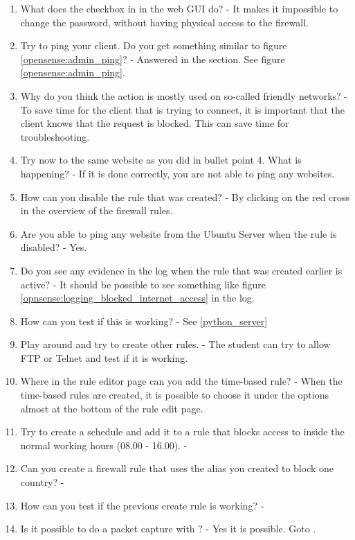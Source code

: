 \begin{enumerate}
    \item What does the  checkbox in  in the web GUI do? - It makes it impossible to change the password, without having physical access to the firewall.
    \item Try to ping your client. Do you get something similar to figure \ref{opensense:admin_ping}? - Answered in the section. See figure \ref{opensense:admin_ping}.
    \item Why do you think the action  is mostly used on so-called friendly networks? - To save time for the client that is trying to connect, it is important that the client knows that the request is blocked. This can save time for troubleshooting.
    \item Try now to  the same website as you did in bullet point 4. What is happening? - If it is done correctly, you are not able to ping any websites.
    \item How can you disable the rule that was created? - By clicking on the red cross in the overview of the firewall rules.
    \item Are you able to ping any website from the Ubuntu Server when the rule is disabled? - Yes.
    \item Do you see any evidence in the log when the rule that was created earlier is active? - It should be possible to see something like figure \ref{opnsense:logging_blocked_internet_access} in the log.
    \item How can you test if this is working? - See \ref{python_server}
    \item Play around and try to create other rules. - The student can try to allow FTP or Telnet and test if it is working.
    \item Where in the rule editor page can you add the time-based rule? - When the time-based rules are created, it is possible to choose it under the  options almost at the bottom of the rule edit page.
    \item Try to create a schedule and add it to a rule that blocks access to  inside the normal working hours (08.00 - 16.00). - 
    \item Can you create a firewall rule that uses the alias you created to block one country? -
    \item How can you test if the previous create rule is working? -
    \item Is it possible to do a packet capture with \opnsense? - Yes it is possible. Goto .

\end{enumerate}
